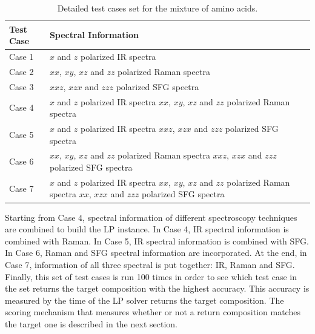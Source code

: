 \begin{table}[ht!]
\begin{center}
{\def\arraystretch{1.5}
\begin{tabular}{| l | p{3in} | }
\hline
Test Case & Spectral Information \\
\hline
Case 1 & $x$ and $z$ polarized IR spectra\\
\hline
Case 2 & $xx$, $xy$, $xz$ and $zz$ polarized Raman spectra \\
\hline
Case 3 & $xxz$, $xzx$ and $zzz$ polarized SFG spectra \\
\hline
Case 4 & $x$ and $z$ polarized IR spectra \newline $xx$, $xy$, $xz$ and $zz$ polarized Raman spectra \\
\hline
Case 5 & $x$ and $z$ polarized IR spectra \newline $xxz$, $xzx$ and $zzz$ polarized SFG spectra　\\
\hline
Case 6 & $xx$, $xy$, $xz$ and $zz$ polarized Raman spectra \newline $xxz$, $xzx$ and $zzz$ polarized SFG spectra \\
\hline
Case 7 & $x$ and $z$ polarized IR spectra \newline
 $xx$, $xy$, $xz$ and $zz$ polarized Raman spectra \newline 
 $xx$, $xzx$ and $zzz$ polarized SFG spectra \\
\hline
\end{tabular} 
}
\end{center}
\caption{Detailed test cases set for the mixture of amino acids.} 
\label{tab:5.1} 
\end{table}	

Starting from Case 4, spectral information of different spectroscopy techniques are combined to build the LP instance. In Case 4, IR spectral information is combined with Raman. In Case 5, IR spectral information is combined with SFG. In Case 6, Raman and SFG spectral information are incorporated. At the end, in Case 7, information of all three spectral is put together: IR, Raman and SFG. \\

Finally, this set of test cases is run 100 times in order to see which test case in the set returns the target composition with the highest accuracy. This accuracy is measured by the time of the LP solver returns the target composition. The scoring mechanism that measures whether or not a return composition matches the target one is described in the next section. \\

